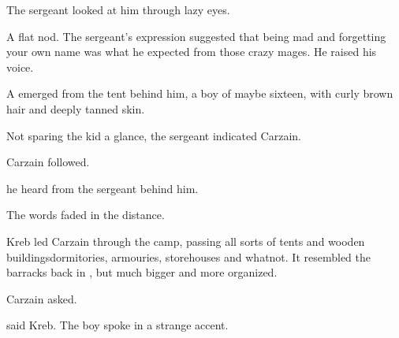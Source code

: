 

The sergeant looked at him through lazy eyes. 


A flat nod. 
The sergeant's expression suggested that being mad and forgetting your own name was what he expected from those crazy mages. 
He raised his voice. 

A \human{} emerged from the tent behind him, a boy of maybe sixteen, with curly brown hair and deeply tanned skin. 

Not sparing the kid a glance, the sergeant indicated Carzain. 


Carzain followed. 


 he heard from the sergeant behind him. 

The words faded in the distance. 

Kreb led Carzain through the camp, passing all sorts of tents and wooden buildings\dash dormitories, armouries, storehouses and whatnot. 
It resembled the barracks back in \Redglen, but much bigger and more organized.


 Carzain asked. 

 said Kreb. 
The boy spoke in a strange accent. 

